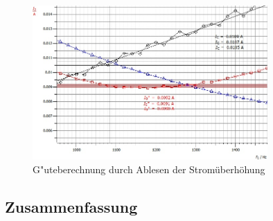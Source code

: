 \documentclass[12pt,a4paper]{article}
\begin{document}
\begin{figure}[H]
	\centering
	\includegraphics[width=0.8\textwidth]{Daten/P47Ohm_I.jpg}
	\caption{G"uteberechnung durch Ablesen der Stromüberhöhung}
	\label{P47Ohm_I}
\end{figure}
























\subsection{Zusammenfassung}
\end{document}

